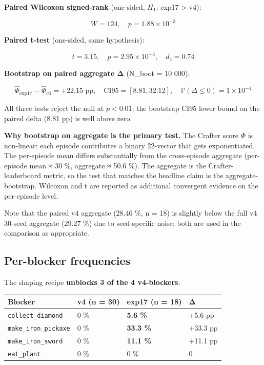 \documentclass[11pt,letterpaper]{article}
\begin{document}
\textbf{Paired Wilcoxon signed-rank} (one-sided, $H_1$: exp17 > v4):

\[
W = 124, \quad p = 1.88 \times 10^{-3}
\]

\textbf{Paired t-test} (one-sided, same hypothesis):

\[
t = 3.15, \quad p = 2.95 \times 10^{-3}, \quad d_z = 0.74
\]

\textbf{Bootstrap on paired aggregate Δ} (N\_boot = 10 000):

\[
\widehat{\Phi}_{\text{exp17}} - \widehat{\Phi}_{v4} = +22.15 \text{ pp}, \quad
\text{CI95} = [8.81, 32.12], \quad \mathbb{P}(\Delta \le 0) = 1 \times 10^{-4}
\]

All three tests reject the null at $p < 0.01$; the bootstrap CI95 lower
bound on the paired delta (8.81 pp) is well above zero.

\textbf{Why bootstrap on aggregate is the primary test.} The Crafter score
$\Phi$ is non-linear: each episode contributes a binary 22-vector that
gets exponentiated. The per-episode mean differs substantially from
the cross-episode aggregate (per-episode mean ≈ 30 \%, aggregate
≈ 50.6 \%). The aggregate is the Crafter-leaderboard metric, so the
test that matches the headline claim is the aggregate-bootstrap.
Wilcoxon and t are reported as additional convergent evidence on the
per-episode level.

Note that the paired v4 aggregate (28.46 \%, n = 18) is slightly below
the full v4 30-seed aggregate (29.27 \%) due to seed-specific noise;
both are used in the comparison as appropriate.

\subsection{Per-blocker frequencies}

The shaping recipe \textbf{unblocks 3 of the 4 v4-blockers}:

\begin{tabular}{l l l l}
\toprule
Blocker & v4 (n = 30) & exp17 (n = 18) & Δ \\
\midrule
\texttt{collect\_diamond} & 0 \% & \textbf{5.6 \%} & +5.6 pp \\
\texttt{make\_iron\_pickaxe} & 0 \% & \textbf{33.3 \%} & +33.3 pp \\
\texttt{make\_iron\_sword} & 0 \% & \textbf{11.1 \%} & +11.1 pp \\
\texttt{eat\_plant} & 0 \% & 0 \% & 0 \\
\bottomrule
\end{tabular}
\end{document}
